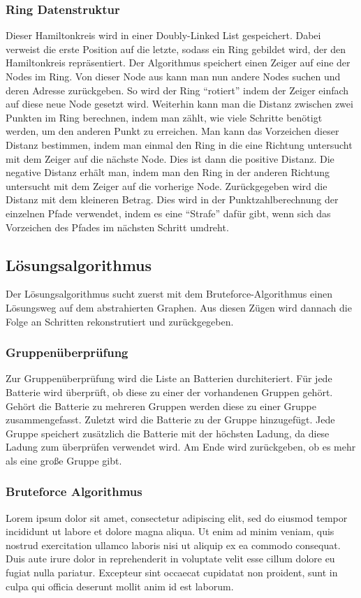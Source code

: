 \documentclass[a4paper,10pt,ngerman]{scrartcl}
\begin{document}
\subsubsection{Ring Datenstruktur}
Dieser Hamiltonkreis wird in einer Doubly-Linked List gespeichert.
Dabei verweist die erste Position auf die letzte, sodass ein Ring gebildet wird, der den Hamiltonkreis repräsentiert.
Der Algorithmus speichert einen Zeiger auf eine der Nodes im Ring.
Von dieser Node aus kann man nun andere Nodes suchen und deren Adresse zurückgeben.
So wird der Ring ``rotiert'' indem der Zeiger einfach auf diese neue Node gesetzt wird.
Weiterhin kann man die Distanz zwischen zwei Punkten im Ring berechnen,
indem man zählt, wie viele Schritte benötigt werden, um den anderen Punkt zu erreichen.
Man kann das Vorzeichen dieser Distanz bestimmen,
indem man einmal den Ring in die eine Richtung untersucht mit dem Zeiger auf die nächste Node.
Dies ist dann die positive Distanz.
Die negative Distanz erhält man, indem man den Ring in der anderen Richtung untersucht mit dem Zeiger auf die vorherige Node.
Zurückgegeben wird die Distanz mit dem kleineren Betrag.
Dies wird in der Punktzahlberechnung der einzelnen Pfade verwendet, indem es eine ``Strafe'' dafür gibt,
wenn sich das Vorzeichen des Pfades im nächsten Schritt umdreht.

\subsection{Lösungsalgorithmus}
Der Lösungsalgorithmus sucht zuerst mit dem Bruteforce-Algorithmus einen Lösungsweg auf dem abstrahierten Graphen.
Aus diesen Zügen wird dannach die Folge an Schritten rekonstrutiert und zurückgegeben.

\subsubsection{Gruppenüberprüfung}
Zur Gruppenüberprüfung wird die Liste an Batterien durchiteriert.
Für jede Batterie wird überprüft, ob diese zu einer der vorhandenen Gruppen gehört.
Gehört die Batterie zu mehreren Gruppen werden diese zu einer Gruppe zusammengefasst.
Zuletzt wird die Batterie zu der Gruppe hinzugefügt.
Jede Gruppe speichert zusätzlich die Batterie mit der höchsten Ladung, da diese Ladung zum überprüfen verwendet wird.
Am Ende wird zurückgeben, ob es mehr als eine große Gruppe gibt.

\subsubsection{Bruteforce Algorithmus}
Lorem ipsum dolor sit amet, consectetur adipiscing elit, sed do eiusmod tempor incididunt ut labore et dolore magna aliqua.
Ut enim ad minim veniam, quis nostrud exercitation ullamco laboris nisi ut aliquip ex ea commodo consequat.
Duis aute irure dolor in reprehenderit in voluptate velit esse cillum dolore eu fugiat nulla pariatur.
Excepteur sint occaecat cupidatat non proident, sunt in culpa qui officia deserunt mollit anim id est laborum.
\end{document}
